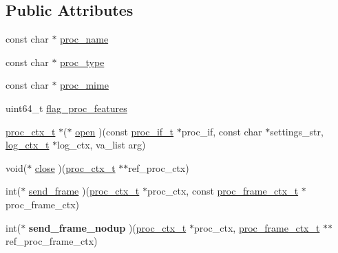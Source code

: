 \subsection*{Public Attributes}
\begin{DoxyCompactItemize}
\item 
const char $\ast$ \hyperlink{structproc__if__s_aa284f1d0bdde2fae0b51101f658430ee}{proc\+\_\+name}
\item 
const char $\ast$ \hyperlink{structproc__if__s_a3a8a04d2e81ca4dfa55a8526644dd729}{proc\+\_\+type}
\item 
const char $\ast$ \hyperlink{structproc__if__s_afdb204f8c976ed829466774aaa6cdf89}{proc\+\_\+mime}
\item 
uint64\+\_\+t \hyperlink{structproc__if__s_a657d976a32c34bff11070599b11c2dd7}{flag\+\_\+proc\+\_\+features}
\item 
\hyperlink{proc_8h_ae264f89be30fc03f5053bc16d58cba05}{proc\+\_\+ctx\+\_\+t} $\ast$($\ast$ \hyperlink{structproc__if__s_a34999576771394dfb721463c8455ba06}{open} )(const \hyperlink{proc_8h_a679816cf30e0b7a8f3e7464e67a6a844}{proc\+\_\+if\+\_\+t} $\ast$proc\+\_\+if, const char $\ast$settings\+\_\+str, \hyperlink{structlog__ctx__s}{log\+\_\+ctx\+\_\+t} $\ast$log\+\_\+ctx, va\+\_\+list arg)
\item 
void($\ast$ \hyperlink{structproc__if__s_af5971ac1d09d1c6ec3508c36fb286c19}{close} )(\hyperlink{proc_8h_ae264f89be30fc03f5053bc16d58cba05}{proc\+\_\+ctx\+\_\+t} $\ast$$\ast$ref\+\_\+proc\+\_\+ctx)
\item 
int($\ast$ \hyperlink{structproc__if__s_a0393cc5e598e19951d447a926c364e3f}{send\+\_\+frame} )(\hyperlink{proc_8h_ae264f89be30fc03f5053bc16d58cba05}{proc\+\_\+ctx\+\_\+t} $\ast$proc\+\_\+ctx, const \hyperlink{structproc__frame__ctx__s}{proc\+\_\+frame\+\_\+ctx\+\_\+t} $\ast$proc\+\_\+frame\+\_\+ctx)
\item 
int($\ast$ {\bfseries send\+\_\+frame\+\_\+nodup} )(\hyperlink{proc_8h_ae264f89be30fc03f5053bc16d58cba05}{proc\+\_\+ctx\+\_\+t} $\ast$proc\+\_\+ctx, \hyperlink{structproc__frame__ctx__s}{proc\+\_\+frame\+\_\+ctx\+\_\+t} $\ast$$\ast$ref\+\_\+proc\+\_\+frame\+\_\+ctx)\hypertarget{structproc__if__s_af460a3b26b0717140cc08014b6c63191}{}\label{structproc__if__s_af460a3b26b0717140cc08014b6c63191}


\end{DoxyCompactItemize}
